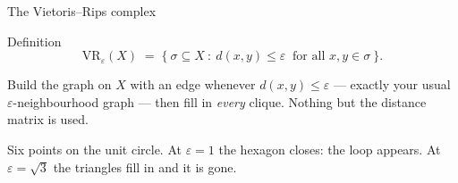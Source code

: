 \documentclass[10pt,aspectratio=169]{beamer}
\newcommand{\VR}{\mathrm{VR}}
\newcommand{\hexpoints}{%
    \foreach \i/\a in {1/0,2/60,3/120,4/180,5/240,6/300}{\coordinate (P\i) at (\a:1.5);}}
\newcommand{\hexdots}{\foreach \i in {1,...,6}{\fill[black] (P\i) circle (2pt);}}
\begin{document}
    \begin{frame}[shrink=5]{The Vietoris--Rips complex}
        \begin{block}{Definition}
            \[
                \VR_\varepsilon(X)\;=\;\bigl\{\ \sigma\subseteq X \ :\ d(x,y)\le\varepsilon
                \ \text{ for all } x,y\in\sigma\ \bigr\}.
            \]
        \end{block}
        Build the graph on $X$ with an edge whenever $d(x,y)\le\varepsilon$ --- exactly your
        usual $\varepsilon$-neighbourhood graph --- then fill in \emph{every} clique.
        Nothing but the distance matrix is used.

        \vspace{0.6em}
        \begin{center}
        \end{center}
        \vspace{-0.2em}
        \small Six points on the unit circle. At $\varepsilon=1$ the hexagon closes: the loop
        appears. At $\varepsilon=\sqrt3$ the triangles fill in and it is gone.
    \end{frame}
\end{document}
